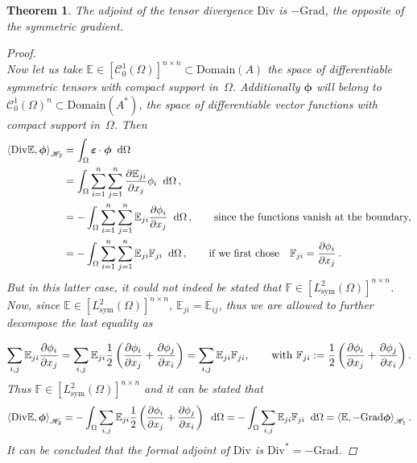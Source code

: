 \documentclass[preprint,12pt]{elsarticle}
\newtheorem{theorem}{Theorem}
\begin{document}
\begin{theorem}{The adjoint of the tensor divergence $\mathrm{Div}$ is $- \mathrm{Grad}$, the opposite of the symmetric gradient.}
\begin{proof}
\[	 \]
	 Now let us take $\mathbb{E} \in [\mathcal{C}_0^1(\Omega)]^{n \times n} \subset \mathrm{Domain}(A)$ the space of differentiable symmetric tensors with compact support in~$\Omega$. Additionally $\bm{\phi}$ will belong to $\mathcal{C}_{0}^1(\Omega)^{n} \subset \mathrm{Domain}(A^*)$, the space of differentiable vector functions with compact support in~$\Omega$. Then
	 \[
	 \begin{aligned}
	 \left\langle \mathrm{Div}\mathbb{E} , \bm{\phi} \right\rangle_{\mathscr{H}_2} &= \int_{\Omega}  \bm{\varepsilon} \cdot \bm{\phi} \; \d\Omega\, \\
	 &= \int_{\Omega} \sum_{i=1}^n \sum_{j=1}^n \diffp{\mathbb{E}_{ji}}{x_j} \phi_i \; \d\Omega\,,  \\ 
	 &= - \int_{\Omega} \sum_{i=1}^n \sum_{j=1}^n \mathbb{E}_{ji} \diffp{\phi_i}{x_j} \; \d\Omega\,, \qquad \text{since the functions vanish at the boundary,}\\
	 &= - \int_{\Omega} \sum_{i=1}^n \sum_{j=1}^n \mathbb{E}_{ji} \mathbb{F}_{ji} \;\d\Omega\,,  \qquad \text{if we first chose} \quad \mathbb{F}_{ji} = \diffp{\phi_i}{x_j}\,.\\
	 \end{aligned}	 
	 \]
	 But in this latter case, it could not indeed  be stated that $\mathbb{F} \in [L^2_{\text{sym}}(\Omega)]^{n \times n}$. Now, since  $\mathbb{E} \in [L^2_{\text{sym}}(\Omega)]^{n \times n}$, $\mathbb{E}_{ji}=\mathbb{E}_{ij}$,  thus we are  allowed to further decompose the last equality as
	  
	 \[ \sum_{i,j}\mathbb{E}_{ji} \diffp{\phi_i}{x_j} = \sum_{i,j}\mathbb{E}_{ji} \frac{1}{2} \left(\diffp{\phi_i}{x_j} + \diffp{\phi_j}{x_i}  \right) = 	\sum_{i,j} \mathbb{E}_{ji} \mathbb{F}_{ji}, \qquad \text{with } \mathbb{F}_{ji}:= \frac{1}{2} \left(\diffp{\phi_i}{x_j} + \diffp{\phi_j}{x_i}  \right).
	 \]
	 Thus $\mathbb{F} \in [L^2_{\text{sym}}(\Omega)]^{n \times n}$ and it can be stated that
	 \[ \left\langle \mathrm{Div}\mathbb{E} , \bm{\phi} \right\rangle_{\mathscr{H}_2} = - \int_{\Omega} \sum_{i,j} \mathbb{E}_{ji} \frac{1}{2} \left(\diffp{\phi_i}{x_j} + \diffp{\phi_j}{x_i}  \right) \;\d\Omega = - \int_{\Omega} \sum_{i,j} \mathbb{E}_{ji} \mathbb{F}_{ji} \;\d\Omega = \left\langle \mathbb{E} , -\mathrm{Grad} \bm{\phi} \right\rangle_{\mathscr{H}_1}. \]
	 It can be concluded that the formal adjoint of $\mathrm{Div}$ is $\mathrm{Div}^* = -\mathrm{Grad}$.
	\end{proof}
\end{theorem}
\end{document}
